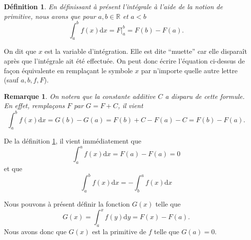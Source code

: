 \documentclass[a4paper,12pt]{book}
\newcommand{\real}{\mathbb{R}}
\newcommand{\dd}{\mathrm{d}}
\newtheorem{definition}{Définition}
\newtheorem*{remarque}{Remarque}
\begin{document}
\begin{definition}\label{def_prim}
En définissant à présent l'intégrale à l'aide de la notion de primitive, nous avons
que pour $a,b\in\real$ et $a<b$
\begin{equation}
 \int_a^b f(x)\dd x=\left.F\right|_a^b=F(b)-F(a).
\end{equation}
\end{definition}
On dit que $x$ est la variable d'intégration. Elle est dite ``muette'' car elle disparaît après que l'intégrale ait été effectuée.
On peut donc écrire l'équation ci-dessus de façon équivalente en remplaçant le symbole $x$ par n'importe quelle autre lettre (sauf $a,b,f,F$).
\begin{remarque}
 On notera que la constante additive $C$ a disparu de cette formule. En effet, remplaçons $F$ par $G=F+C$, il vient
\begin{equation*}
 \int_a^b f(x)\dd x=G(b)-G(a)=F(b)+C-F(a)-C=F(b)-F(a). 
\end{equation*}
\end{remarque}
De la définition \ref{def_prim}, il vient immédiatement que 
\begin{equation}
 \int_a^af(x)\dd x=F(a)-F(a)=0
\end{equation}
et que
\begin{equation}
 \int_a^bf(x)\dd x= -\int_b^af(x)\dd x
\end{equation}

Nous pouvons à présent définir la fonction $G(x)$ telle que
\begin{equation}
 G(x)=\int_a^xf(y)\dd y=F(x)-F(a).
\end{equation}
Nous avons donc que $G(x)$ est la primitive de $f$ telle que $G(a)=0$.
\end{document}
